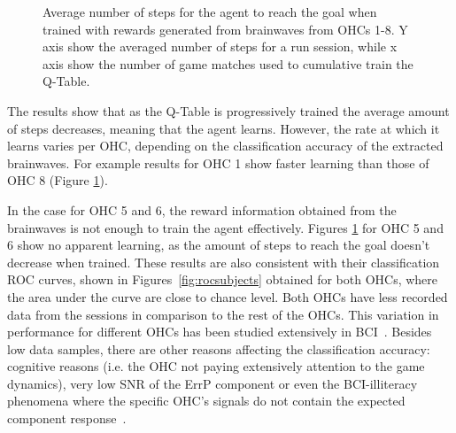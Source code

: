\documentclass[journal]{IEEEtran}
\begin{document}
{{\begin{figure}[h!]
\begin{subfigure}{0.5\textwidth}
\end{subfigure}
\caption{Average number of steps for the agent to reach the goal when trained with rewards generated from brainwaves from OHCs 1-8. Y axis show the averaged number of steps for a run session, while x axis show the number of game matches used to cumulative train the Q-Table.}
\label{fig:avg_steps}
\end{figure}


The results show that as the Q-Table is progressively trained the average amount of steps decreases, meaning that the agent learns. However, the rate at which it learns varies per OHC, depending on the classification accuracy of the extracted brainwaves.  For example results for OHC 1 show faster learning than those of OHC 8 (Figure \ref{fig:avg_steps}).

In the case for OHC 5 and 6, the reward information obtained from the brainwaves is not enough to train the agent effectively. Figures \ref{fig:avg_steps} for OHC 5 and 6 show no apparent learning, as the amount of steps to reach the goal doesn't decrease when trained.  These results are also consistent with their classification ROC curves, shown in Figures~\ref{fig:rocsubjects} obtained for both OHCs, where the area under the curve are close to chance level.  Both OHCs have less recorded data from the sessions in comparison to the rest of the OHCs.  This variation in performance for different OHCs has been studied extensively in BCI~\cite{Chavarriaga2014}.  Besides low data samples, there are other reasons affecting the classification accuracy:  cognitive reasons (i.e. the OHC not paying extensively attention to the game dynamics), very low SNR of the ErrP component or even the BCI-illiteracy phenomena where the specific OHC's signals do not contain the expected component response~\cite{Yousefi2019}.

}}
\end{document}
